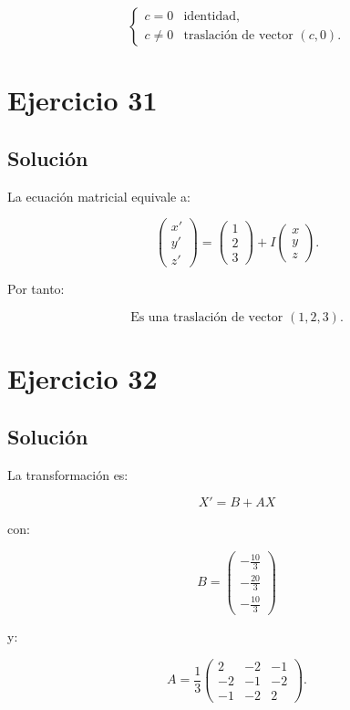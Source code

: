 \documentclass[11pt,a4paper]{article}
\begin{document}
\[
\boxed{
\begin{cases}
c=0 & \text{identidad},\\
c\neq0 & \text{traslación de vector }(c,0).
\end{cases}
}
\]

\section{Ejercicio 31}
\subsection{Solución}

La ecuación matricial equivale a:

\[
\begin{pmatrix}
x'\\
y'\\
z'
\end{pmatrix}
=
\begin{pmatrix}
1\\
2\\
3
\end{pmatrix}
+
I
\begin{pmatrix}
x\\
y\\
z
\end{pmatrix}.
\]

Por tanto:

\[
\boxed{
\text{Es una traslación de vector }(1,2,3).
}
\]

\section{Ejercicio 32}
\subsection{Solución}

La transformación es:

\[
X'=B+AX
\]

con:

\[
B=
\begin{pmatrix}
-\frac{10}{3}\\[1mm]
-\frac{20}{3}\\[1mm]
-\frac{10}{3}
\end{pmatrix}
\]

y:

\[
A=
\frac13
\begin{pmatrix}
2&-2&-1\\
-2&-1&-2\\
-1&-2&2
\end{pmatrix}.
\]
\end{document}
